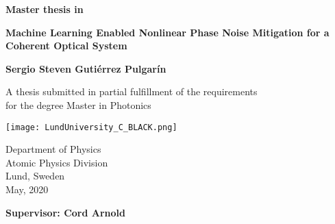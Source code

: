 
\setcounter{page}{1}

\newpage



\thispagestyle{empty}
\begin{center}
   \vspace*{1cm}
  {\large \textbf{Master thesis in  }}

  \vspace*{0.5cm}
  {\LARGE \bf\noindent \textbf{Machine Learning Enabled Nonlinear Phase Noise Mitigation for a Coherent Optical System  }}

  \vspace*{1cm}
  {\large\bf Sergio Steven Guti\'errez Pulgar\'in}
  
  \vfill

  {\large A thesis submitted in partial fulfillment of the requirements\\
  [1mm] for the degree Master in Photonics}
  \vspace*{0.9cm}
  
   \texttt{[image: LundUniversity\_C\_BLACK.png]}

  {\large Department of Physics \\
          [-1mm] Atomic Physics Division\\
          [-1mm] Lund, Sweden\\
          [1mm]  May, 2020}
          
  \vspace*{0.25cm}
	{\normalsize \bf \hfill Supervisor: Cord Arnold}
\end{center}

